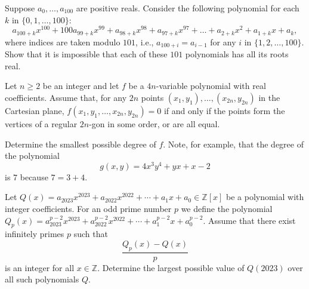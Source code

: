 \documentclass[11pt]{article}
\theoremstyle{definition}
\begin{document}
%	


\begin{question}[name={2023 India National Olympiad, \href{https://artofproblemsolving.com/community/c6h2995077p26888629}{Problem 2}}]
	Suppose $a_0,\ldots, a_{100}$ are positive reals. Consider the following polynomial for each $k$ in $\{0,1,\ldots, 100\}$:
	$$a_{100+k}x^{100}+100a_{99+k}x^{99}+a_{98+k}x^{98}+a_{97+k}x^{97}+\dots+a_{2+k}x^2+a_{1+k}x+a_k,$$where indices are taken modulo $101$, i.e., $a_{100+i}=a_{i-1}$ for any $i$ in $\{1,2,\dots, 100\}$. Show that it is impossible that each of these $101$ polynomials has all its roots real.
\end{question}

%	


\begin{question}[name={2023 Romanian Masters in Mathematics, \href{https://artofproblemsolving.com/community/c6h3024172p27195414}{Problem 3}}]
	Let $n\geq 2$ be an integer and let $f$ be a $4n$-variable polynomial with real coefficients. Assume that, for any $2n$ points $(x_1,y_1),\dots,(x_{2n},y_{2n})$ in the Cartesian plane, $f(x_1,y_1,\dots,x_{2n},y_{2n})=0$ if and only if the points form the vertices of a regular $2n$-gon in some order, or are all equal.
	
	Determine the smallest possible degree of $f$. Note, for example, that the degree of the polynomial $$g(x,y)=4x^3y^4+yx+x-2$$ is $7$ because $7=3+4$.
\end{question}


%	


\begin{question}[name={2023 Macedonian Team Selection Test, \href{https://artofproblemsolving.com/community/c6h3076286p27781633}{Problem 5}}]
	Let $Q(x) = a_{2023}x^{2023}+a_{2022}x^{2022}+\cdots+a_{1}x+a_{0} \in \mathbb{Z}[x]$ be a polynomial with integer coefficients. For an odd prime number $p$ we define the polynomial $Q_{p}(x) = a_{2023}^{p-2}x^{2023}+a_{2022}^{p-2}x^{2022}+\cdots+a_{1}^{p-2}x+a_{0}^{p-2}.$
	Assume that there exist infinitely primes $p$ such that
	$$\frac{Q_{p}(x)-Q(x)}{p}$$is an integer for all $x \in \mathbb{Z}$. Determine the largest possible value of $Q(2023)$ over all such polynomials $Q$.
\end{question}
\end{document}
